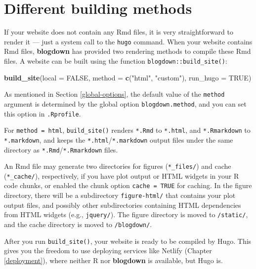 \documentclass[12pt,]{krantz}
\makeatletter
\newenvironment{Shaded}{\begin{snugshade}}{\end{snugshade}}
\newcommand{\DataTypeTok}[1]{\textcolor[rgb]{0.13,0.29,0.53}{#1}}
\newcommand{\KeywordTok}[1]{\textcolor[rgb]{0.13,0.29,0.53}{\textbf{#1}}}
\newcommand{\NormalTok}[1]{#1}
\newcommand{\OtherTok}[1]{\textcolor[rgb]{0.56,0.35,0.01}{#1}}
\newcommand{\StringTok}[1]{\textcolor[rgb]{0.31,0.60,0.02}{#1}}
\newenvironment{kframe}{%
\medskip{}
\setlength{\fboxsep}{.8em}
 \def\at@end@of@kframe{}%
 \ifinner\ifhmode%
  \def\at@end@of@kframe{\end{minipage}}%
  \begin{minipage}{\columnwidth}%
 \fi\fi%
 \def\FrameCommand##1{\hskip\@totalleftmargin \hskip-\fboxsep
 \colorbox{shadecolor}{##1}\hskip-\fboxsep
     \hskip-\linewidth \hskip-\@totalleftmargin \hskip\columnwidth}%
 \MakeFramed {\advance\hsize-\width
   \@totalleftmargin\z@ \linewidth\hsize
   \@setminipage}}%
 {\par\unskip\endMakeFramed%
 \at@end@of@kframe}
\renewenvironment{Shaded}{\begin{kframe}}{\end{kframe}}
\theoremstyle{definition}
\theoremstyle{definition}
\theoremstyle{definition}
\theoremstyle{remark}
\makeatother
\begin{document}
\hypertarget{methods}{%
\section{Different building methods}\label{methods}}

If your website does not contain any Rmd files, it is very
straightforward to render it --- just a system call to the \texttt{hugo}
command. When your website contains Rmd files, \textbf{blogdown} has
provided two rendering methods to compile these Rmd files. A website can
be built using the function \texttt{blogdown::build\_site()}:

\begin{Shaded}
\begin{Highlighting}[]
\KeywordTok{build_site}\NormalTok{(}\DataTypeTok{local =} \OtherTok{FALSE}\NormalTok{, }\DataTypeTok{method =} \KeywordTok{c}\NormalTok{(}\StringTok{"html"}\NormalTok{, }\StringTok{"custom"}\NormalTok{),}
  \DataTypeTok{run_hugo =} \OtherTok{TRUE}\NormalTok{)}
\end{Highlighting}
\end{Shaded}

As mentioned in Section \ref{global-options}, the default value of the
\texttt{method} argument is determined by the global option
\texttt{blogdown.method}, and you can set this option in
\texttt{.Rprofile}.

For \texttt{method\ =\ \textquotesingle{}html\textquotesingle{}},
\texttt{build\_site()} renders \texttt{*.Rmd} to \texttt{*.html}, and
\texttt{*.Rmarkdown} to \texttt{*.markdown}, and keeps the
\texttt{*.html}/\texttt{*.markdown} output files under the same
directory as \texttt{*.Rmd}/\texttt{*.Rmarkdown} files.

An Rmd file may generate two directories for figures
(\texttt{*\_files/}) and cache (\texttt{*\_cache/}), respectively, if
you have plot output or HTML widgets \citep{R-htmlwidgets} in your R
code chunks, or enabled the chunk option \texttt{cache\ =\ TRUE} for
caching. In the figure directory, there will be a subdirectory
\texttt{figure-html/} that contains your plot output files, and possibly
other subdirectories containing HTML dependencies from HTML widgets
(e.g., \texttt{jquery/}). The figure directory is moved to
\texttt{/static/}, and the cache directory is moved to
\texttt{/blogdown/}.

After you run \texttt{build\_site()}, your website is ready to be
compiled by Hugo. This gives you the freedom to use deploying services
like Netlify (Chapter \ref{deployment}), where neither R nor
\textbf{blogdown} is available, but Hugo is.
\end{document}
